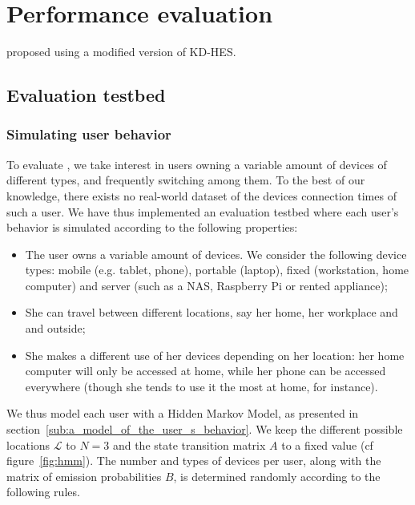 \section{Performance evaluation}%
\label{Performance}

\Textcite{ANOBE} proposed using a modified version of \ac{KD-HES}.

\subsection{Evaluation testbed} %
\label{sub:evaluation_testbed}



\subsubsection{Simulating user behavior} %
\label{ssub:simulating_user_behavior}


To evaluate \name, we take interest in users owning a variable amount of devices of different types, and frequently switching among them.
To the best of our knowledge, there exists no real-world dataset of the devices connection times of such a user.
We have thus implemented an evaluation testbed where each user's behavior is simulated  according to the following properties:
\begin{itemize}
	\item The user owns a variable amount of devices. We consider the following device types: mobile (e.g. tablet, phone), portable (laptop), fixed (workstation, home computer) and server (such as a NAS, Raspberry Pi or rented appliance);
	\item She can travel between different locations, say her home, her workplace and and outside;
	\item She makes a different use of her devices depending on her location: her home computer will only be accessed at home, while her phone can be accessed everywhere (though she tends to use it the most at home, for instance).
\end{itemize}

We thus model each user with a Hidden Markov Model, as presented in section~\ref{sub:a_model_of_the_user_s_behavior}.
We keep the different possible locations $\mathcal{L}$ to $N=3$ and the state transition matrix $A$ to a fixed value (cf figure~\ref{fig:hmm}).
The number and types of devices per user, along with the matrix of emission probabilities $B$, is determined randomly according to the following rules.

